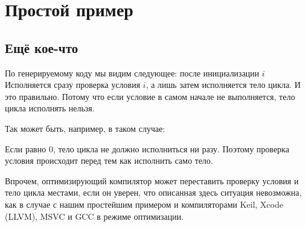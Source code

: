\section{Простой пример}





\subsection{Ещё кое-что}

По генерируемому коду мы видим следующее: после инициализации $i$%
Исполняется сразу проверка условия $i$, а лишь затем исполняется тело цикла.
И это правильно. 
Потому что если условие в самом начале не выполняется, тело цикла исполнять нельзя.

Так может быть, например, в таком случае:



Если  равно 0,
тело цикла не должно исполниться ни разу.
Поэтому проверка условия происходит перед тем как исполнить само тело.

Впрочем, оптимизирующий компилятор может переставить проверку условия и тело цикла местами, если он уверен,
что описанная здесь ситуация невозможна, как в случае с нашим простейшим примером и компиляторами 
Keil, Xcode (LLVM), MSVC и GCC в режиме оптимизации.

